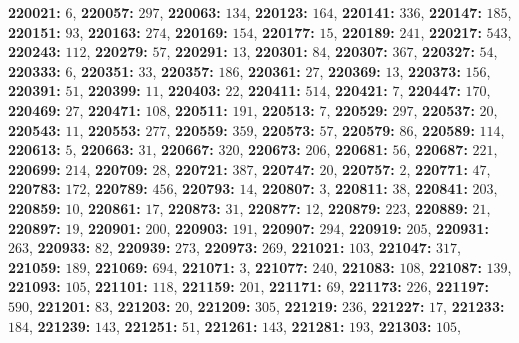 \textsf{\bfseries 220021:} $6$, \textsf{\bfseries 220057:} $297$, \textsf{\bfseries 220063:} $134$, \textsf{\bfseries 220123:} $164$, \textsf{\bfseries 220141:} $336$, \textsf{\bfseries 220147:} $185$, \textsf{\bfseries 220151:} $93$, \textsf{\bfseries 220163:} $274$, \textsf{\bfseries 220169:} $154$, \textsf{\bfseries 220177:} $15$, \textsf{\bfseries 220189:} $241$, \textsf{\bfseries 220217:} $543$, \textsf{\bfseries 220243:} $112$, \textsf{\bfseries 220279:} $57$, \textsf{\bfseries 220291:} $13$, \textsf{\bfseries 220301:} $84$, \textsf{\bfseries 220307:} $367$, \textsf{\bfseries 220327:} $54$, \textsf{\bfseries 220333:} $6$, \textsf{\bfseries 220351:} $33$, \textsf{\bfseries 220357:} $186$, \textsf{\bfseries 220361:} $27$, \textsf{\bfseries 220369:} $13$, \textsf{\bfseries 220373:} $156$, \textsf{\bfseries 220391:} $51$, \textsf{\bfseries 220399:} $11$, \textsf{\bfseries 220403:} $22$, \textsf{\bfseries 220411:} $514$, \textsf{\bfseries 220421:} $7$, \textsf{\bfseries 220447:} $170$, \textsf{\bfseries 220469:} $27$, \textsf{\bfseries 220471:} $108$, \textsf{\bfseries 220511:} $191$, \textsf{\bfseries 220513:} $7$, \textsf{\bfseries 220529:} $297$, \textsf{\bfseries 220537:} $20$, \textsf{\bfseries 220543:} $11$, \textsf{\bfseries 220553:} $277$, \textsf{\bfseries 220559:} $359$, \textsf{\bfseries 220573:} $57$, \textsf{\bfseries 220579:} $86$, \textsf{\bfseries 220589:} $114$, \textsf{\bfseries 220613:} $5$, \textsf{\bfseries 220663:} $31$, \textsf{\bfseries 220667:} $320$, \textsf{\bfseries 220673:} $206$, \textsf{\bfseries 220681:} $56$, \textsf{\bfseries 220687:} $221$, \textsf{\bfseries 220699:} $214$, \textsf{\bfseries 220709:} $28$, \textsf{\bfseries 220721:} $387$, \textsf{\bfseries 220747:} $20$, \textsf{\bfseries 220757:} $2$, \textsf{\bfseries 220771:} $47$, \textsf{\bfseries 220783:} $172$, \textsf{\bfseries 220789:} $456$, \textsf{\bfseries 220793:} $14$, \textsf{\bfseries 220807:} $3$, \textsf{\bfseries 220811:} $38$, \textsf{\bfseries 220841:} $203$, \textsf{\bfseries 220859:} $10$, \textsf{\bfseries 220861:} $17$, \textsf{\bfseries 220873:} $31$, \textsf{\bfseries 220877:} $12$, \textsf{\bfseries 220879:} $223$, \textsf{\bfseries 220889:} $21$, \textsf{\bfseries 220897:} $19$, \textsf{\bfseries 220901:} $200$, \textsf{\bfseries 220903:} $191$, \textsf{\bfseries 220907:} $294$, \textsf{\bfseries 220919:} $205$, \textsf{\bfseries 220931:} $263$, \textsf{\bfseries 220933:} $82$, \textsf{\bfseries 220939:} $273$, \textsf{\bfseries 220973:} $269$, \textsf{\bfseries 221021:} $103$, \textsf{\bfseries 221047:} $317$, \textsf{\bfseries 221059:} $189$, \textsf{\bfseries 221069:} $694$, \textsf{\bfseries 221071:} $3$, \textsf{\bfseries 221077:} $240$, \textsf{\bfseries 221083:} $108$, \textsf{\bfseries 221087:} $139$, \textsf{\bfseries 221093:} $105$, \textsf{\bfseries 221101:} $118$, \textsf{\bfseries 221159:} $201$, \textsf{\bfseries 221171:} $69$, \textsf{\bfseries 221173:} $226$, \textsf{\bfseries 221197:} $590$, \textsf{\bfseries 221201:} $83$, \textsf{\bfseries 221203:} $20$, \textsf{\bfseries 221209:} $305$, \textsf{\bfseries 221219:} $236$, \textsf{\bfseries 221227:} $17$, \textsf{\bfseries 221233:} $184$, \textsf{\bfseries 221239:} $143$, \textsf{\bfseries 221251:} $51$, \textsf{\bfseries 221261:} $143$, \textsf{\bfseries 221281:} $193$, \textsf{\bfseries 221303:} $105$, 
